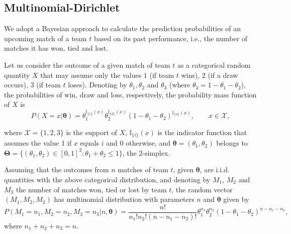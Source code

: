 \documentclass[journal,article,accept,moreauthors,pdftex,12pt,a4paper]{mdpi}
\begin{document}
    \subsection{Multinomial-Dirichlet}
    \label{sec::Mn_Dir}

        We adopt a Bayesian approach to calculate the prediction probabilities of an upcoming match of a team $t$ based on its past performance, i.e., the number of matches it has won, tied and lost.

        Let us consider the outcome of a given match of team $t$ as a categorical random quantity $X$ that may assume only the values $1$ (if team $t$ wins), $2$ (if a draw occurs), $3$ (if team $t$ loses).
        Denoting by $\theta_1, \theta_2$ and $\theta_3$ (where $\theta_3 = 1-\theta_1 - \theta_2$), the probabilities of win, draw and loss, respectively, the probability mass function of $X$ is
        \[
        P(X=x | \boldsymbol{\theta}) = \theta_1^{\mathbb{I}_{\{1\}}(x)}
        \theta_2^{\mathbb{I}_{\{2\}}(x)}(1 - \theta_1 -
        \theta_2)^{{\mathbb{I}_{\{3\}}}(x)}, \qquad x \in \mathcal{X},
        \]

        \noindent
        where $\mathcal{X}=\{1,2,3\}$ is the support of $X$,
        $\mathbb{I}_{\{i\}}(x)$ is the indicator function that assumes the
        value 1 if $x$ equals $i$ and 0 otherwise, and $\boldsymbol{\theta}
        = (\theta_1, \theta_2)$ belongs to $\boldsymbol{\Theta} =
        \{(\theta_1,\theta_2)\in [0,1]^2: \theta_1+\theta_2 \leq 1 \}$, the 2-simplex.

        Assuming that the outcomes from $n$ matches of team $t$, given $\boldsymbol{\theta}$, are i.i.d. quantities with the above categorical distribution, and denoting by $M_1$, $M_2$ and $M_3$ the number of matches won, tied or lost by team $t$, the random vector $(M_1, M_2, M_2)$ has multinomial distribution with parameters $n$ and $\boldsymbol{\theta}$ given by
        \[
        P(M_1=n_1,M_2=n_2,M_3=n_3| n, \boldsymbol{\theta})=
        \frac{n!}{n_1!n_2!(n-n_1-n_2)!}\theta_1^{n_1}\theta_2^{n_2}(1-\theta_1-\theta_2)^{n-n_1-n_2},
        \]
        \noindent
        where $n_1 + n_2 + n_3 = n$.
\end{document}
